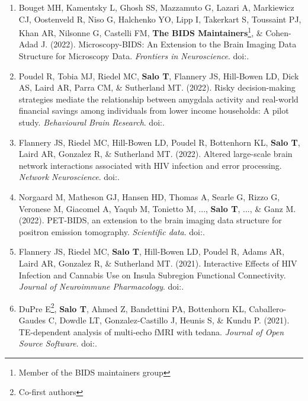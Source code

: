 \documentclass[10pt]{article}
\newcommand{\textlink}[3][blue]{\href{#2}{\color{#1}{#3}}}
\begin{document}
\begin{enumerate}

	\item Bouget MH, Kamentsky L, Ghosh SS, Mazzamuto G, Lazari A, Markiewicz CJ, Oostenveld R, Niso G, Halchenko YO, Lipp I, Takerkart S, Toussaint PJ, Khan AR, Nilsonne G, Castelli FM, \textbf{The BIDS Maintainers}\footnote{Member of the BIDS maintainers group}, \& Cohen-Adad J.
	(2022).
	Microscopy-BIDS: An Extension to the Brain Imaging Data Structure for Microscopy Data.
	\emph{Frontiers in Neuroscience}.
	doi:\textlink{https://doi.org/10.3389/fnins.2022.871228}{10.3389/fnins.2022.871228}.

	\item Poudel R, Tobia MJ, Riedel MC, \textbf{Salo T}, Flannery JS, Hill-Bowen LD, Dick AS, Laird AR, Parra CM, \& Sutherland MT.
	(2022).
	Risky decision-making strategies mediate the relationship between amygdala activity and real-world financial savings among individuals from lower income households: A pilot study.
	\emph{Behavioural Brain Research}.
	doi:\textlink{https://doi.org/10.1016/j.bbr.2022.113867}{10.1016/j.bbr.2022.113867}.

	\item Flannery JS, Riedel MC, Hill-Bowen LD, Poudel R, Bottenhorn KL, \textbf{Salo T}, Laird AR, Gonzalez R, \& Sutherland MT.
	(2022).
	Altered large-scale brain network interactions associated with HIV infection and error processing.
	\emph{Network Neuroscience}.
	doi:\textlink{https://doi.org/10.1162/netn_a_00241}{10.1162/netn\_a\_00241}.

	\item Norgaard M, Matheson GJ, Hansen HD, Thomas A, Searle G, Rizzo G, Veronese M, Giacomel A, Yaqub M, Tonietto M, ..., \textbf{Salo T}, ..., \& Ganz M.
	(2022).
	PET-BIDS, an extension to the brain imaging data structure for positron emission tomography.
	\emph{Scientific data}.
	doi:\textlink{https://doi.org/10.1038/s41597-022-01164-1}{10.1038/s41597-022-01164-1}.

	\item Flannery JS, Riedel MC, \textbf{Salo T}, Hill-Bowen LD, Poudel R, Adams AR, Laird AR, Gonzalez R, \& Sutherland MT.
	(2021).
	Interactive Effects of HIV Infection and Cannabis Use on Insula Subregion Functional Connectivity.
	\emph{Journal of Neuroimmune Pharmacology}.
	doi:\textlink{https://doi.org/10.1007/s11481-021-10005-8}{10.1007/s11481-021-10005-8}.

	\item DuPre E\footnote{\label{note1}Co-first authors}, \textbf{Salo T}, Ahmed Z, Bandettini PA, Bottenhorn KL, Caballero-Gaudes C, Dowdle LT, Gonzalez-Castillo J, Heunis S, \& Kundu P.
	(2021).
	TE-dependent analysis of multi-echo fMRI with tedana.
	\emph{Journal of Open Source Software}.
	doi:\textlink{https://doi.org/10.21105/joss.03669}{10.21105/joss.03669}.


\end{enumerate}
\end{document}
